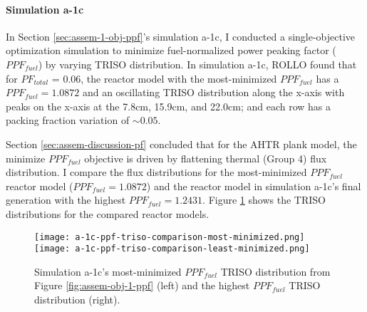 \paragraph{Simulation a-1c}
In Section \ref{sec:assem-1-obj-ppf}'s simulation a-1c, I conducted a single-objective 
optimization simulation to minimize fuel-normalized power peaking factor ($PPF_{fuel}$) 
by varying TRISO distribution. 
In simulation a-1c, \gls{ROLLO} found that for $PF_{total}$ = 0.06, the reactor model 
with the most-minimized $PPF_{fuel}$ has a $PPF_{fuel} = 1.0872$ and an oscillating 
TRISO distribution along the x-axis with peaks on the x-axis at the 7.8cm, 
15.9cm, and 22.0cm; and each row has a packing fraction variation of $\sim0.05$.

Section \ref{sec:assem-discussion-pf} concluded that for the \gls{AHTR} plank 
model, the minimize $PPF_{fuel}$ objective is driven by flattening thermal 
(Group 4) flux distribution. 
I compare the flux distributions for the most-minimized $PPF_{fuel}$ reactor model  
($PPF_{fuel} = 1.0872$) and the reactor model in simulation a-1c's final generation
with the highest $PPF_{fuel} = 1.2431$. 
Figure \ref{fig:a-1c-ppf-triso-comparison} shows the TRISO distributions for the 
compared reactor models. 
\begin{figure}[htbp!]
    \centering
    \texttt{[image: a-1c-ppf-triso-comparison-most-minimized.png]} 
    \texttt{[image: a-1c-ppf-triso-comparison-least-minimized.png]} 
    \caption{Simulation a-1c's most-minimized $PPF_{fuel}$ TRISO distribution 
    from Figure \ref{fig:assem-obj-1-ppf} (left) and the highest $PPF_{fuel}$ TRISO distribution (right).}
    \label{fig:a-1c-ppf-triso-comparison}
\end{figure}

